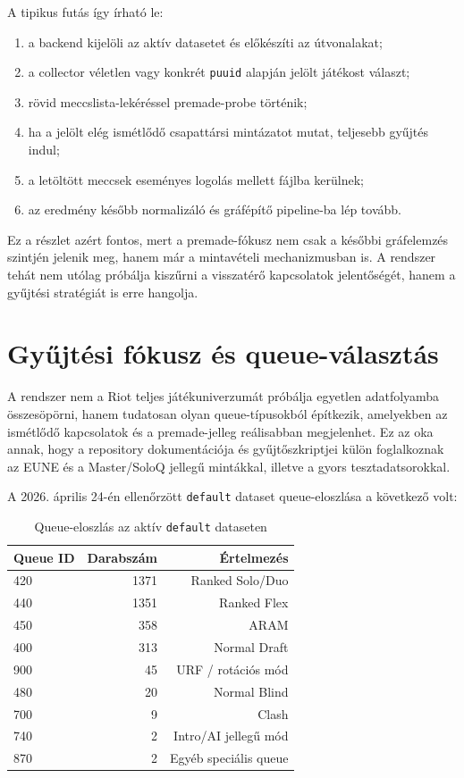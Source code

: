 \documentclass[a4paper,12pt]{report}
\begin{document}
A tipikus futás így írható le:

\begin{enumerate}
    \item a backend kijelöli az aktív datasetet és előkészíti az útvonalakat;
    \item a collector véletlen vagy konkrét \texttt{puuid} alapján jelölt játékost választ;
    \item rövid meccslista-lekéréssel premade-probe történik;
    \item ha a jelölt elég ismétlődő csapattársi mintázatot mutat, teljesebb gyűjtés indul;
    \item a letöltött meccsek eseményes logolás mellett fájlba kerülnek;
    \item az eredmény később normalizáló és gráfépítő pipeline-ba lép tovább.
\end{enumerate}

Ez a részlet azért fontos, mert a premade-fókusz nem csak a későbbi gráfelemzés szintjén jelenik meg, hanem már a mintavételi mechanizmusban is. A rendszer tehát nem utólag próbálja kiszűrni a visszatérő kapcsolatok jelentőségét, hanem a gyűjtési stratégiát is erre hangolja.

\section{Gyűjtési fókusz és queue-választás}

A rendszer nem a Riot teljes játékuniverzumát próbálja egyetlen adatfolyamba összesöpörni, hanem tudatosan olyan queue-típusokból építkezik, amelyekben az ismétlődő kapcsolatok és a premade-jelleg reálisabban megjelenhet. Ez az oka annak, hogy a repository dokumentációja és gyűjtőszkriptjei külön foglalkoznak az EUNE és a Master/SoloQ jellegű mintákkal, illetve a gyors tesztadatsorokkal.

A 2026. április 24-én ellenőrzött \texttt{default} dataset queue-eloszlása a következő volt:

\begin{table}[H]
\centering
\caption{Queue-eloszlás az aktív \texttt{default} dataseten}
\begin{tabular}{lrr}
\toprule
\textbf{Queue ID} & \textbf{Darabszám} & \textbf{Értelmezés} \\
\midrule
420 & 1371 & Ranked Solo/Duo \\
440 & 1351 & Ranked Flex \\
450 & 358 & ARAM \\
400 & 313 & Normal Draft \\
900 & 45 & URF / rotációs mód \\
480 & 20 & Normal Blind \\
700 & 9 & Clash \\
740 & 2 & Intro/AI jellegű mód \\
870 & 2 & Egyéb speciális queue \\
\bottomrule
\end{tabular}
\end{table}
\end{document}
